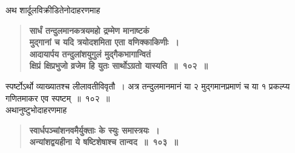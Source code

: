 \documentclass[11pt, openany]{book}
\begin{document}
\newpage

\begin{sloppypar}
{\small अथ शार्दूलविक्रीडितेनोदाहरणमाह\textendash }

 \label{7.102}
\begin{quote}
{\large \textbf{{\color{purple}सार्धं तन्दुलमानकत्रयमहो द्रम्मेण मानाष्टकं\\
मुद्गानां च यदि त्रयोदशमिता एता वणिक्काकिणीः~।\\
आदायार्पय तन्दुलांशयुगुलं मुद्गैकभागान्वितं\\
क्षिप्रं क्षिप्रभुजो व्रजेम हि युतः सार्थोऽग्रतो यास्यति~॥~१०२~॥}}}
\end{quote}

स्पर्ष्टोऽर्थो व्याख्यातश्च लीलावतीविवृतौ~। अत्र तन्दुलमानमानं या २ मुद्गमानप्रमाणं च या १ प्रकल्प्य गणितमाकर एव स्पष्टम्~॥~१०२~॥\\

{\small अथानुष्टुभोदाहरणमाह\textendash }

 \label{7.103}
\begin{quote}
{\large \textbf{{\color{purple}स्वार्धपञ्चांशनवमैर्युक्ताः के स्युः समास्त्रयः~।\\
अन्यांशद्वयहीना ये षष्टिशेषाश्च तान्वद~॥~१०३~॥}}}
\end{quote}


\end{sloppypar}
\end{document}
